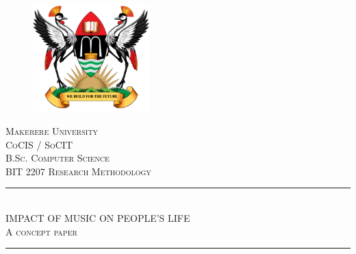 \documentclass[12pt, a4paper]{report}
\begin{document}
\begin{titlepage}

\newcommand{\HRule}{\rule{\linewidth}{0.1mm}} %

\center %


\begin{figure}
    \centering
  \includegraphics[width=0.4\textwidth]{muklogo.png}
\end{figure}
 

\textsc{\LARGE Makerere University}\\[0.7cm] %
\textsc{\Large CoCIS / SoCIT}\\[0.2cm] %
\textsc{\large B.Sc. Computer Science}\\[0.1cm] %
\textsc{\small BIT 2207 Research Methodology}\\[0.8cm]


\HRule \\[0.6cm]
\textsc{\Large IMPACT OF MUSIC ON PEOPLE'S LIFE}\\[0.4cm]
\small{\textsc{A concept paper}}
\HRule \\[1.0cm]
 


\end{titlepage}
\end{document}
